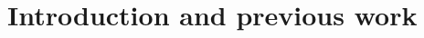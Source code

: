 \documentclass[11pt]{article}
\begin{document}


\section{Introduction and previous work}
\end{document}
